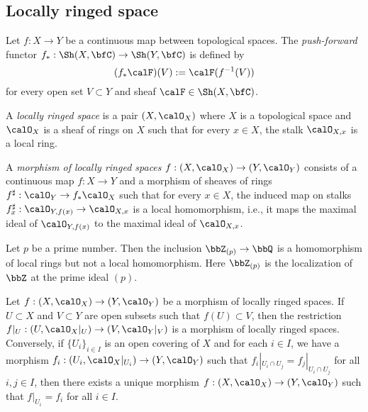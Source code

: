 

\subsection{Locally ringed space}

       \begin{definition}\label{def:push_forward_of_sheaves}
        Let \(f : X \to Y\) be a continuous map between topological spaces.
        The \emph{push-forward} functor \(f_* : \Sh(X, \bfC) \to \Sh(Y, \bfC)\) is defined by 
        \[
            (f_*\calF)(V) := \calF(f^{-1}(V))
        \]
        for every open set \(V \subset Y\) and sheaf \(\calF \in \Sh(X, \bfC)\).
    \end{definition}
    
    \begin{definition}\label{def:locally_ringed_space}
        A \emph{locally ringed space} is a pair \((X, \calO_X)\) where \(X\) is a topological space and \(\calO_X\) is a sheaf of rings on \(X\) such that for every \(x \in X\), the stalk \(\calO_{X,x}\) is a local ring.
        
        A \emph{morphism of locally ringed spaces} \(f : (X, \calO_X) \to (Y, \calO_Y)\) consists of a continuous map \(f : X \to Y\) and a morphism of sheaves of rings \(f^\sharp : \calO_Y \to f_*\calO_X\) 
        such that for every \(x \in X\), the induced map on stalks \(f_x^\sharp : \calO_{Y,f(x)} \to \calO_{X,x}\) is a local homomorphism, 
        i.e., it maps the maximal ideal of \(\calO_{Y,f(x)}\) to the maximal ideal of \(\calO_{X,x}\).
    \end{definition}

    \begin{example}\label{eg:non_local_homomorphism_of_local_rings}
        Let \(p\) be a prime number.
        Then the inclusion \(\bbZ_{(p)} \to \bbQ\) is a homomorphism of local rings but not a local homomorphism.
        Here \(\bbZ_{(p)}\) is the localization of \(\bbZ\) at the prime ideal \((p)\).
    \end{example}

    \begin{example}\label{eg:glue_morphisms_of_locally_ringed_spaces}
        Let \(f : (X, \calO_X) \to (Y, \calO_Y)\) be a morphism of locally ringed spaces.
        If \(U \subset X\) and \(V \subset Y\) are open subsets such that \(f(U) \subset V\), then the restriction \(f|_U : (U, \calO_X|_U) \to (V, \calO_Y|_V)\) is a morphism of locally ringed spaces.
        Conversely, if \(\{U_i\}_{i \in I}\) is an open covering of \(X\) and for each \(i \in I\), we have a morphism \(f_i : (U_i, \calO_X|_{U_i}) \to (Y, \calO_Y)\) such that \(f_i|_{U_i \cap U_j} = f_j|_{U_i \cap U_j}\) for all \(i,j \in I\),
        then there exists a unique morphism \(f : (X, \calO_X) \to (Y, \calO_Y)\) such that \(f|_{U_i} = f_i\) for all \(i \in I\).
    \end{example}

